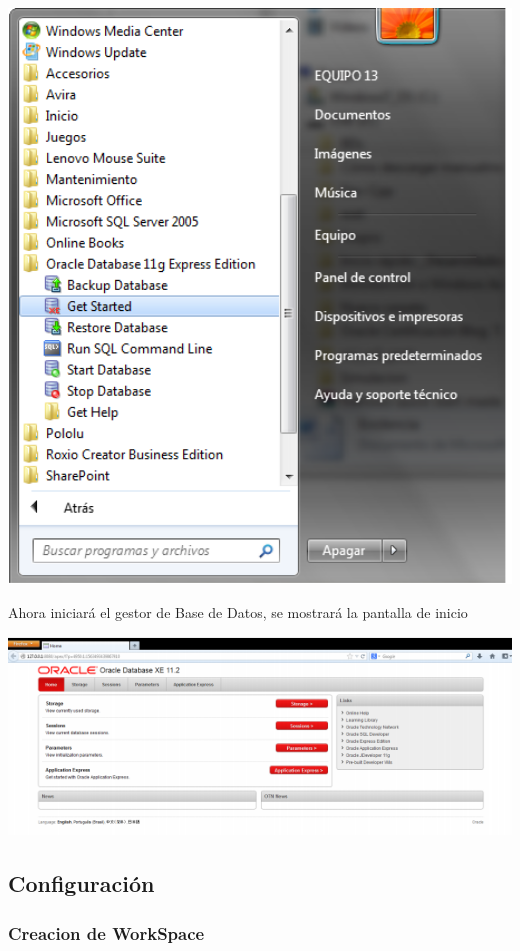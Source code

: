 \documentclass[12pt,letterpaper]{article}
\begin{document}
\begin{center}
\includegraphics[width=14cm]{./IMG/img4menu}
\end{center} 
Ahora iniciar\'a el gestor de Base de Datos, se mostrar\'a la pantalla de inicio
\begin{center}
\includegraphics[width=15cm]{./IMG/img5}
\end{center} 


\subsection{Configuraci\'on}
\subsubsection{Creacion de WorkSpace}
\end{document}
